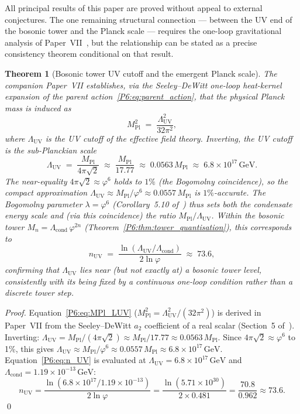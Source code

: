 \documentclass[11pt,a4paper]{article}
\newtheorem{theorem}{Theorem}[section]
\theoremstyle{definition}
\theoremstyle{remark}
\newcommand{\vp}{\varphi}
\newcommand{\lam}{\lambda}
\newcommand{\Lcond}{\Lambda_{\mathrm{cond}}}
\newcommand{\LUV}{\Lambda_{\mathrm{UV}}}
\newcommand{\MPl}{M_{\mathrm{Pl}}}
\begin{document}
All principal results of this paper are proved without appeal to
external conjectures.  The one remaining structural connection ---
between the UV end of the bosonic tower and the Planck scale ---
requires the one-loop gravitational analysis of Paper~VII~\cite{Paper7},
but the relationship can be stated as a precise consistency theorem
conditional on that result.

\begin{theorem}[Bosonic tower UV cutoff and the emergent Planck scale]
\label{P6:thm:luv_tower}
The companion Paper~VII establishes, via the Seeley--DeWitt
one-loop heat-kernel expansion of the parent
action~\eqref{P6:eq:parent_action}, that the physical Planck mass
is induced as~\cite{Paper7}
\begin{equation}
  \MPl^2 \;=\; \frac{\LUV^2}{32\pi^2},
  \label{P6:eq:MPl_LUV}
\end{equation}
where $\LUV$ is the UV cutoff of the effective field theory.
Inverting, the UV cutoff is the sub-Planckian scale
\begin{equation}
  \boxed{\LUV \;=\; \frac{\MPl}{4\pi\sqrt{2}}
  \;\approx\; \frac{\MPl}{17.77}
  \;\approx\; 0.0563\,\MPl
  \;\approx\; 6.8\times10^{17}\,\mathrm{GeV}.}
  \label{P6:eq:LUV_exact}
\end{equation}
The near-equality $4\pi\sqrt{2}\approx\vp^6$ holds to $1\%$
(the Bogomolny coincidence), so the compact approximation
$\LUV\approx\MPl/\vp^6\approx0.0557\,\MPl$ is $1\%$-accurate.
The Bogomolny parameter $\lam = \vp^6$ (Corollary~5.10 of~\cite{Paper1})
thus sets both the condensate energy scale and (via this coincidence)
the ratio $\MPl/\LUV$.
Within the bosonic tower $M_n = \Lcond\,\vp^{2n}$
(Theorem~\ref{P6:thm:tower_quantisation}), this corresponds to
\begin{equation}
  n_{\mathrm{UV}} \;=\; \frac{\ln(\LUV/\Lcond)}{2\ln\vp}
  \;\approx\; 73.6,
  \label{P6:eq:n_UV}
\end{equation}
confirming that $\LUV$ lies near (but not exactly at) a bosonic tower
level, consistently with its being fixed by a continuous one-loop
condition rather than a discrete tower step.
\end{theorem}

\begin{proof}
Equation~\eqref{P6:eq:MPl_LUV} ($\MPl^2 = \LUV^2/(32\pi^2)$) is derived
in Paper~VII from the Seeley--DeWitt $a_2$ coefficient of a real scalar
(Section~5 of~\cite{Paper7}).
Inverting: $\LUV = \MPl/(4\pi\sqrt{2})\approx\MPl/17.77\approx0.0563\,\MPl$.
Since $4\pi\sqrt{2}\approx\vp^6$ to 1\%, this gives $\LUV\approx\MPl/\vp^6
\approx0.0557\,\MPl\approx6.8\times10^{17}\,\mathrm{GeV}$.
Equation~\eqref{P6:eq:n_UV} is evaluated at $\LUV = 6.8\times10^{17}\,\mathrm{GeV}$
and $\Lcond = 1.19\times10^{-13}\,\mathrm{GeV}$:
\[
  n_\mathrm{UV}
  = \frac{\ln(6.8\times10^{17}/1.19\times10^{-13})}{2\ln\vp}
  = \frac{\ln(5.71\times10^{30})}{2\times0.481}
  = \frac{70.8}{0.962}
  \approx 73.6.
\]
\qed
\end{proof}
\end{document}
